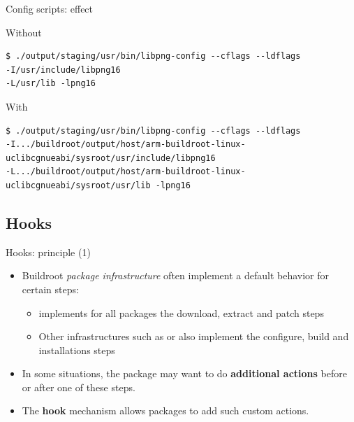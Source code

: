 \begin{frame}[fragile]{Config scripts: effect}

\begin{block}{Without }
{\footnotesize
  \begin{verbatim}
$ ./output/staging/usr/bin/libpng-config --cflags --ldflags
-I/usr/include/libpng16
-L/usr/lib -lpng16
  \end{verbatim}}
\end{block}

\begin{block}{With }
{\tiny
  \begin{verbatim}
$ ./output/staging/usr/bin/libpng-config --cflags --ldflags
-I.../buildroot/output/host/arm-buildroot-linux-uclibcgnueabi/sysroot/usr/include/libpng16
-L.../buildroot/output/host/arm-buildroot-linux-uclibcgnueabi/sysroot/usr/lib -lpng16
  \end{verbatim}}
\end{block}

\end{frame}

\subsection{Hooks}

\begin{frame}{Hooks: principle (1)}
  \begin{itemize}
  \item Buildroot {\em package infrastructure} often implement a
    default behavior for certain steps:
    \begin{itemize}
    \item {} implements for all packages the
      download, extract and patch steps
    \item Other infrastructures such as  or
       also implement the configure, build and
      installations steps
    \end{itemize}
  \item In some situations, the package may want to do {\bf additional
      actions} before or after one of these steps.
  \item The {\bf hook} mechanism allows packages to add such custom
    actions.
  \end{itemize}
\end{frame}

